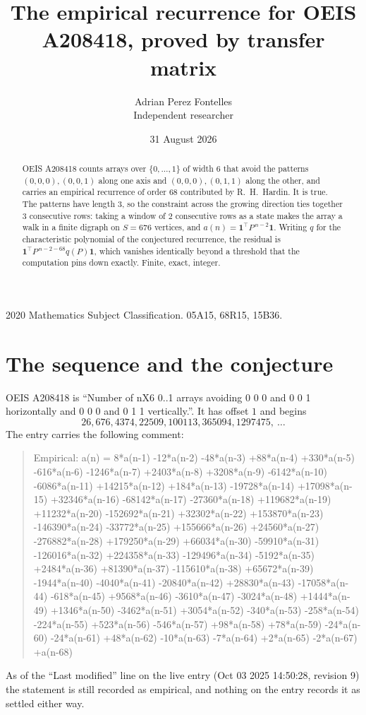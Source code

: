 \documentclass[11pt,a4paper]{article}
\title{The empirical recurrence for OEIS A208418, proved by transfer matrix}
\author{Adrian Perez Fontelles\\ \small Independent researcher}
\date{31 August 2026}
\theoremstyle{plain}
\theoremstyle{definition}
\begin{document}
\maketitle

\begin{abstract}
OEIS A208418 counts arrays over $\{0,\dots,1\}$ of width $6$ that avoid the patterns
$(0,0,0), (0,0,1)$ along one axis and $(0,0,0), (0,1,1)$ along the other, and carries an empirical recurrence of
order $68$ contributed by R.~H.~Hardin. It is true. The patterns have length $3$, so
the constraint across the growing direction ties together $3$ consecutive rows: taking a
window of $2$ consecutive rows as a state makes the array a walk in a finite digraph
on $S=676$ vertices, and $a(n)=\mathbf{1}^{\!\top}P^{\,n-2}\mathbf{1}$. Writing $q$
for the characteristic polynomial of the conjectured recurrence, the residual is
$\mathbf{1}^{\!\top}P^{\,n-2-68}q(P)\mathbf{1}$, which vanishes identically
beyond a threshold that the computation pins down exactly. Finite, exact, integer.
\end{abstract}

\noindent\small 2020 Mathematics Subject Classification. 05A15, 68R15, 15B36.\normalsize

\section{The sequence and the conjecture}

OEIS A208418 is ``Number of nX6 0..1 arrays avoiding 0 0 0 and 0 0 1 horizontally and 0 0 0 and 0 1 1 vertically.''. It has offset
$1$ and begins
\[
26, 676, 4374, 22509, 100113, 365094, 1297475,\ \dots
\]
The entry carries the following comment:
\begin{quote}\small
Empirical: a(n) = 8*a(n-1) -12*a(n-2) -48*a(n-3) +88*a(n-4) +330*a(n-5) -616*a(n-6) -1246*a(n-7) +2403*a(n-8) +3208*a(n-9) -6142*a(n-10) -6086*a(n-11) +14215*a(n-12) +184*a(n-13) -19728*a(n-14) +17098*a(n-15) +32346*a(n-16) -68142*a(n-17) -27360*a(n-18) +119682*a(n-19) +11232*a(n-20) -152692*a(n-21) +32302*a(n-22) +153870*a(n-23) -146390*a(n-24) -33772*a(n-25) +155666*a(n-26) +24560*a(n-27) -276882*a(n-28) +179250*a(n-29) +66034*a(n-30) -59910*a(n-31) -126016*a(n-32) +224358*a(n-33) -129496*a(n-34) -5192*a(n-35) +2484*a(n-36) +81390*a(n-37) -115610*a(n-38) +65672*a(n-39) -1944*a(n-40) -4040*a(n-41) -20840*a(n-42) +28830*a(n-43) -17058*a(n-44) -618*a(n-45) +9568*a(n-46) -3610*a(n-47) -3024*a(n-48) +1444*a(n-49) +1346*a(n-50) -3462*a(n-51) +3054*a(n-52) -340*a(n-53) -258*a(n-54) -224*a(n-55) +523*a(n-56) -546*a(n-57) +98*a(n-58) +78*a(n-59) -24*a(n-60) -24*a(n-61) +48*a(n-62) -10*a(n-63) -7*a(n-64) +2*a(n-65) -2*a(n-67) +a(n-68)
\end{quote}
As of the ``Last modified'' line on the live entry (Oct 03 2025 14:50:28, revision
9) the statement is still recorded as empirical, and nothing on the entry
records it as settled either way.
\end{document}
